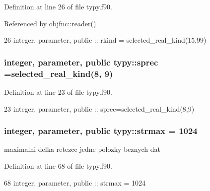 Definition at line 26 of file typy.\+f90.



Referenced by objfnc\+::reader().


\begin{DoxyCode}
26     \textcolor{keywordtype}{integer}, \textcolor{keywordtype}{parameter}, \textcolor{keywordtype}{public} :: rkind = selected\_real\_kind(15,99)
\end{DoxyCode}
\subsubsection[{sprec}]{\setlength{\rightskip}{0pt plus 5cm}integer, parameter, public typy\+::sprec =selected\+\_\+real\+\_\+kind(8, 9)}\label{namespacetypy_a298bf05440c7f02aa0b18c47966def03}


Definition at line 23 of file typy.\+f90.


\begin{DoxyCode}
23     \textcolor{keywordtype}{integer}, \textcolor{keywordtype}{parameter}, \textcolor{keywordtype}{public} :: sprec=selected\_real\_kind(8,9)
\end{DoxyCode}
\subsubsection[{strmax}]{\setlength{\rightskip}{0pt plus 5cm}integer, parameter, public typy\+::strmax = 1024}\label{namespacetypy_a0e473281928fc9c218d9e9c6d19a3aa9}


maximalni delka retezce jedne polozky beznych dat 



Definition at line 68 of file typy.\+f90.


\begin{DoxyCode}
68     \textcolor{keywordtype}{integer}, \textcolor{keywordtype}{parameter}, \textcolor{keywordtype}{public} :: strmax = 1024
\end{DoxyCode}
